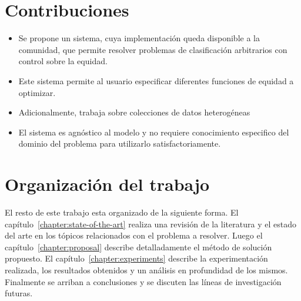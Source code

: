 
\section*{Contribuciones}

\begin{itemize}
    \item Se propone un sistema, cuya implementación queda disponible a la comunidad, que permite resolver problemas de clasificación arbitrarios con control sobre la equidad.
    \item Este sistema permite al usuario especificar diferentes funciones de equidad a optimizar.
    \item Adicionalmente, trabaja sobre colecciones de datos heterogéneas
    \item El sistema es agnóstico al modelo y no requiere conocimiento especifico del dominio del problema para utilizarlo satisfactoriamente.
\end{itemize}

\section*{Organización del trabajo}

El resto de este trabajo esta organizado de la siguiente forma.
El capítulo~\ref{chapter:state-of-the-art} realiza una revisión de la literatura y el estado del arte en los tópicos relacionados con el problema a resolver.
Luego el capítulo~\ref{chapter:proposal} describe detalladamente el método de solución propuesto.
El capítulo~\ref{chapter:experiments} describe la experimentación realizada, los resultados obtenidos y un análisis en profundidad de los mismos.
Finalmente se arriban a conclusiones y se discuten las líneas de investigación futuras.